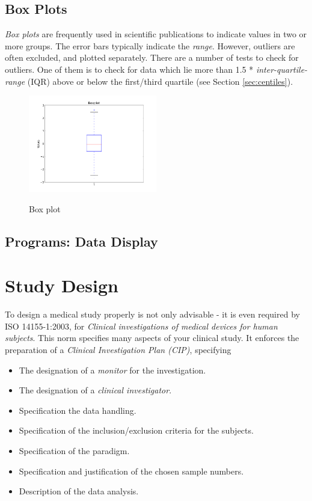\subsection{Box Plots}

\emph{Box plots} are frequently used in scientific publications to indicate values in two or more groups. The error bars typically indicate the \emph{range}. However, outliers are often excluded, and plotted separately. There are a number of tests to check for outliers. One of them is to check for data which lie more than 1.5 * \emph{inter-quartile-range} (IQR) above or below the first/third quartile (see Section \ref{sec:centiles}).

\begin{figure}[!ht]
  \centering
  \includegraphics[width=0.5\textwidth]{../Images/boxplot.png}\\
  \caption{Box plot}\label{fig:Boxplot}
\end{figure}

\subsection{Programs: Data Display}


\section{Study Design}

To design a medical study properly is not only advisable - it is even required by ISO 14155-1:2003, for \emph{Clinical investigations of medical devices for human subjects}. This norm specifies many aspects of your clinical study. It enforces the preparation of a \emph{Clinical Investigation Plan (CIP)}, specifying

\begin{itemize}
  \item The designation of a \emph{monitor} for the investigation.
  \item The designation of a \emph{clinical investigator}.
  \item Specification the data handling.
  \item Specification of the inclusion/exclusion criteria for the subjects.
  \item Specification of the paradigm.
  \item Specification and justification of the chosen sample numbers.
  \item Description of the data analysis.
\end{itemize}

